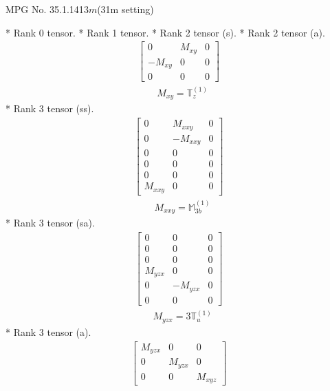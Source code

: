 \documentclass[fleqn,8pt,landscape]{jsarticle}
\begin{document}
\setcounter{MaxMatrixCols}{32}

\renewcommand{\tablename}{Table~}
\renewcommand{\figurename}{Figure~}
\begin{center}
\LARGE
MPG No. 35.1.141\quad$3m$\quad(31m setting)
\end{center}
* Rank 0 tensor.
* Rank 1 tensor.
* Rank 2 tensor (s).
* Rank 2 tensor (a).
\begin{align*}
\begin{bmatrix} 0 & M_{xy} & 0 \\ - M_{xy} & 0 & 0 \\ 0 & 0 & 0 \end{bmatrix}
\end{align*}
\begin{align*}
& M_{xy} = \mathbb{T}_{z}^{(1)}
\end{align*}
* Rank 3 tensor (ss).
\begin{align*}
\begin{bmatrix} 0 & M_{xxy} & 0 \\ 0 & - M_{xxy} & 0 \\ 0 & 0 & 0 \\ 0 & 0 & 0 \\ 0 & 0 & 0 \\ M_{xxy} & 0 & 0 \end{bmatrix}
\end{align*}
\begin{align*}
& M_{xxy} = \mathbb{M}_{3b}^{(1)}
\end{align*}
* Rank 3 tensor (sa).
\begin{align*}
\begin{bmatrix} 0 & 0 & 0 \\ 0 & 0 & 0 \\ 0 & 0 & 0 \\ M_{yzx} & 0 & 0 \\ 0 & - M_{yzx} & 0 \\ 0 & 0 & 0 \end{bmatrix}
\end{align*}
\begin{align*}
& M_{yzx} = 3 \mathbb{T}_{u}^{(1)}
\end{align*}
* Rank 3 tensor (a).
\begin{align*}
\begin{bmatrix} M_{yzx} & 0 & 0 \\ 0 & M_{yzx} & 0 \\ 0 & 0 & M_{xyz} \end{bmatrix}
\end{align*}
\end{document}
